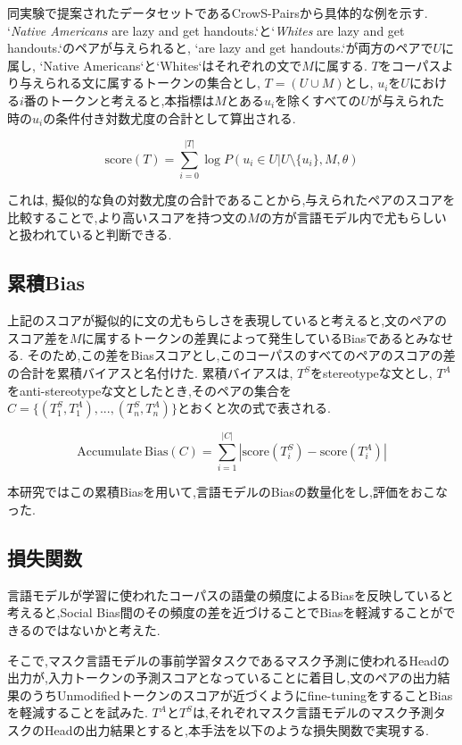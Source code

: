 \documentclass[
  platex, dvipdfmx %
]{nlp2021}
\begin{document}
同実験で提案されたデータセットであるCrowS-Pairsから具体的な例を示す. `\emph{Native Americans} are lazy and get handouts.`と`\emph{Whites} are lazy and get handouts.`のペアが与えられると, `are lazy and get handouts.`が両方のペアで$U$に属し, `Native Americans`と`Whites`はそれぞれの文で$M$に属する.
$T$をコーパスより与えられる文に属するトークンの集合とし, $T = (U \cup M)$とし, $u_i$を$U$における$i$番のトークンと考えると,本指標は$M$とある$u_i$を除くすべての$U$が与えられた時の$u_i$の条件付き対数尤度の合計として算出される.

\begin{equation}
\mathrm{score}(T) = \sum_{i=0}^{|T|}{\log{P(u_i \in U | U \setminus \{u_i\}, M, \theta)}}
\label{eq:pseudo_log_likelihood}
\end{equation}

これは, 擬似的な負の対数尤度の合計であることから,与えられたペアのスコアを比較することで,より高いスコアを持つ文の$M$の方が言語モデル内で尤もらしいと扱われていると判断できる.

\subsection{累積Bias}
上記のスコアが擬似的に文の尤もらしさを表現していると考えると,文のペアのスコア差を$M$に属するトークンの差異によって発生しているBiasであるとみなせる.
そのため,この差をBiasスコアとし,このコーパスのすべてのペアのスコアの差の合計を累積バイアスと名付けた.
累積バイアスは, $T^S$をstereotypeな文とし, $T^A$をanti-stereotypeな文としたとき,そのペアの集合を$C = \{(T_1^S, T_1^A), ... , (T_n^S, T_n^A)\}$とおくと次の式で表される.

\begin{equation}
\mathrm{Accumulate\ Bias}(C) = \sum_{i=1}^{|C|}|\mathrm{score}(T_i^S) - \mathrm{score}(T_i^A)|
\label{eq:bias_score}
\end{equation}

本研究ではこの累積Biasを用いて,言語モデルのBiasの数量化をし,評価をおこなった.

\subsection{損失関数}
言語モデルが学習に使われたコーパスの語彙の頻度によるBiasを反映していると考えると,Social Bias間のその頻度の差を近づけることでBiasを軽減することができるのではないかと考えた.

そこで,マスク言語モデルの事前学習タスクであるマスク予測に使われるHeadの出力が,入力トークンの予測スコアとなっていることに着目し,文のペアの出力結果のうちUnmodifiedトークンのスコアが近づくようにfine-tuningをすることBiasを軽減することを試みた.
$T^A$と$T^S$は,それぞれマスク言語モデルのマスク予測タスクのHeadの出力結果とすると,本手法を以下のような損失関数で実現する.
\end{document}
